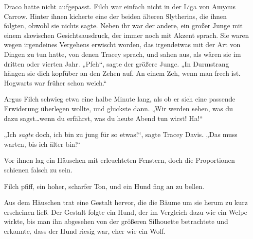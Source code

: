 Draco hatte nicht aufgepasst. Filch war einfach nicht in der Liga von Amycus Carrow.
Hinter ihnen kicherte eine der beiden älteren Slytherins, die ihnen folgten, obwohl sie nichts sagte. Neben ihr war der andere, ein großer Junge mit einem slawischen Gesichtsausdruck, der immer noch mit Akzent sprach. Sie waren wegen irgendeines Vergehens erwischt worden, das irgendetwas mit der Art von Dingen zu tun hatte, von denen Tracey sprach, und sahen aus, als wären sie im dritten oder vierten Jahr.
„Pfeh“, sagte der größere Junge. „In Durmstrang hängen sie dich kopfüber an den Zehen auf. An einem Zeh, wenn man frech ist. Hogwarts war früher schon weich.“

Argus Filch schwieg etwa eine halbe Minute lang, als ob er sich eine passende Erwiderung überlegen wollte, und gluckste dann. „Wir werden sehen, was du dazu sagst…wenn du erfährst, was du heute Abend tun wirst! Ha!“

„Ich \emph{sagte} doch, ich bin zu jung für so etwas!“, sagte Tracey Davis. „Das muss warten, bis ich älter bin!“

Vor ihnen lag ein Häuschen mit erleuchteten Fenstern, doch die Proportionen schienen falsch zu sein.

Filch pfiff, ein hoher, scharfer Ton, und ein Hund fing an zu bellen.

Aus dem Häuschen trat eine Gestalt hervor, die die Bäume um sie herum zu kurz erscheinen ließ. Der Gestalt folgte ein Hund, der im Vergleich dazu wie ein Welpe wirkte, bis man ihn abgesehen von der größeren Silhouette betrachtete und erkannte, dass der Hund riesig war, eher wie ein Wolf.

